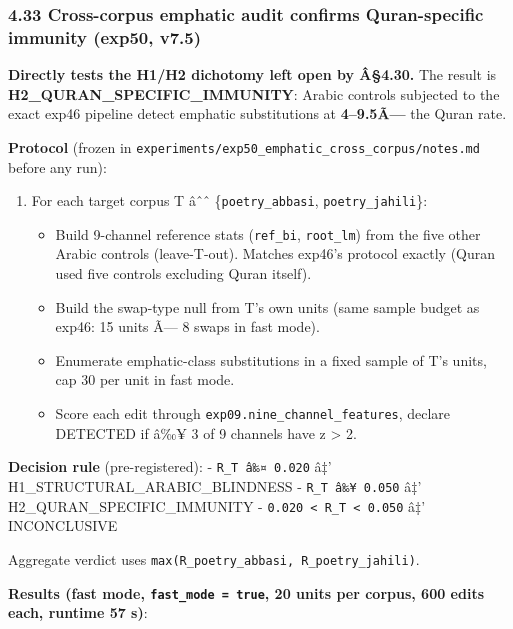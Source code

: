 \documentclass[
]{article}
\providecommand{\tightlist}{%
  \setlength{\itemsep}{0pt}\setlength{\parskip}{0pt}}
\begin{document}
\subsubsection{4.33 Cross-corpus emphatic audit confirms Quran-specific
immunity (exp50,
v7.5)}\label{cross-corpus-emphatic-audit-confirms-quran-specific-immunity-exp50-v7.5}

\textbf{Directly tests the H1/H2 dichotomy left open by Â§4.30.} The
result is \textbf{H2\_QURAN\_SPECIFIC\_IMMUNITY}: Arabic controls
subjected to the exact exp46 pipeline detect emphatic substitutions at
\textbf{4--9.5Ã---} the Quran rate.

\textbf{Protocol} (frozen in
\texttt{experiments/exp50\_emphatic\_cross\_corpus/notes.md} before any
run):

\begin{enumerate}
\def\labelenumi{\arabic{enumi}.}
\tightlist
\item
  For each target corpus T âˆˆ \{\texttt{poetry\_abbasi},
  \texttt{poetry\_jahili}\}:

  \begin{itemize}
  \tightlist
  \item
    Build 9-channel reference stats (\texttt{ref\_bi},
    \texttt{root\_lm}) from the five other Arabic controls
    (leave-T-out). Matches exp46's protocol exactly (Quran used five
    controls excluding Quran itself).
  \item
    Build the swap-type null from T's own units (same sample budget as
    exp46: 15 units Ã--- 8 swaps in fast mode).
  \item
    Enumerate emphatic-class substitutions in a fixed sample of T's
    units, cap 30 per unit in fast mode.
  \item
    Score each edit through \texttt{exp09.nine\_channel\_features},
    declare DETECTED if â‰¥ 3 of 9 channels have \textbar z\textbar{}
    \textgreater{} 2.
  \end{itemize}
\end{enumerate}

\textbf{Decision rule} (pre-registered): - \texttt{R\_T\ â‰¤\ 0.020} â‡'
H1\_STRUCTURAL\_ARABIC\_BLINDNESS - \texttt{R\_T\ â‰¥\ 0.050} â‡'
H2\_QURAN\_SPECIFIC\_IMMUNITY -
\texttt{0.020\ \textless{}\ R\_T\ \textless{}\ 0.050} â‡' INCONCLUSIVE

Aggregate verdict uses
\texttt{max(R\_poetry\_abbasi,\ R\_poetry\_jahili)}.

\textbf{Results (fast mode, \texttt{fast\_mode\ =\ true}, 20 units per
corpus, 600 edits each, runtime 57 s)}:
\end{document}
